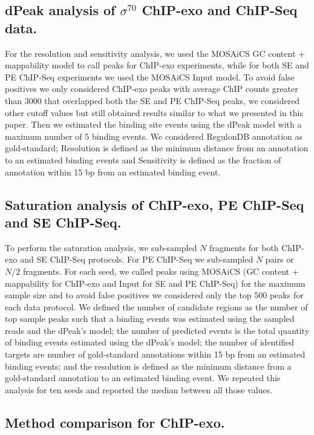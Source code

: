 \documentclass{bmcart}\usepackage[]{graphicx}\usepackage[]{color}
\newcommand{\sig}{\sigma^{70}}
\begin{document}
\subsection*{dPeak analysis of $\sig$ ChIP-exo and ChIP-Seq data.}

For the resolution and sensitivity analysis, we used the MOSAiCS GC
content + mappability model to call peaks for ChIP-exo experiments,
while for both SE and PE ChIP-Seq experiments we used the MOSAiCS
Input model. To avoid false positives we only considered ChIP-exo
peaks with average ChIP counts greater than 3000 that overlapped both
the SE and PE ChIP-Seq peaks, we considered other cutoff values but
still obtained results similar to what we presented in this
paper. Then we estimated the binding site events using the dPeak model
with a maximum number of 5 binding events. We considered RegulonDB
annotation as gold-standard; Resolution is defined as the minimum
distance from an annotation to an estimated binding events and
Sensitivity is defined as the fraction of annotation within
15 bp from an estimated binding event.

\subsection*{Saturation analysis of ChIP-exo, PE ChIP-Seq and SE ChIP-Seq.}

To perform the saturation analysis, we sub-sampled $N$ fragments for
both ChIP-exo and SE ChIP-Seq protocols. For PE ChIP-Seq we
sub-sampled $N$ pairs or $N/2$ fragments. For each seed, we called
peaks using MOSAiCS \cite{mosaics} (GC content + mappability for
ChIP-exo and Input for SE and PE ChIP-Seq) for the maximum sample size
and to avoid false positives we considered only the top 500 peaks for
each data protocol. We defined the number of candidate regions as the
number of top sample peaks such that a binding events was estimated
using the sampled reads and the dPeak's model; the number of predicted
events is the total quantity of binding events estimated using the
dPeak's model; the number of identified targets are number of
gold-standard annotations within 15 bp from an estimated binding
events; and the resolution is defined as the minimum distance from a
gold-standard annotation to an estimated binding event. We repeated
this analysis for ten seeds and reported the median between all those
values.

\subsection*{Method comparison for ChIP-exo.}
\end{document}
